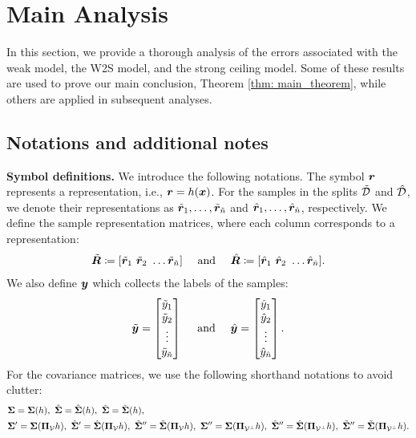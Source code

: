 
\section{Main Analysis}

In this section, we provide a thorough analysis of the errors associated with the weak model, the W2S model, and the strong ceiling model. Some of these results are used to prove our main conclusion, Theorem \ref{thm: main_theorem}, while others are applied in subsequent analyses.

\subsection{Notations and additional notes}

\textbf{Symbol definitions.} 
We introduce the following notations. The symbol ${\bm{r}}$ represents a representation, i.e., ${\bm{r}} = h({\bm{x}})$. For the samples in the splits $\tilde{{\mathcal{D}}}$ and $\hat{{\mathcal{D}}}$, we denote their representations as $\tilde{{\bm{r}}}_1, \dots, \tilde{{\bm{r}}}_{\tilde{n}}$ and $\hat{{\bm{r}}}_1, \dots, \hat{{\bm{r}}}_{\hat{n}}$, respectively. We define the sample representation matrices, where each column corresponds to a representation:
\begin{align}
    \nonumber
    \tilde{{\bm{R}}} \coloneqq [ \tilde{{\bm{r}}}_1 ~ \tilde{{\bm{r}}}_2 ~\dots \tilde{{\bm{r}}}_{\tilde{n}}  ] ~~~~\text{and}~~~~ \hat{{\bm{R}}} \coloneqq [ \hat{{\bm{r}}}_1 ~ \hat{{\bm{r}}}_2 ~\dots \hat{{\bm{r}}}_{\hat{n}}  ].
\end{align}
We also define ${\bm{y}}$ which collects the labels of the samples:
\begin{align}
    \nonumber
    \tilde{{\bm{y}}} =
\begin{bmatrix}
\tilde{y}_1 \\
\tilde{y}_2 \\
\vdots \\
\tilde{y}_{\tilde{n}}
\end{bmatrix}
 ~~~~\text{and}~~~~ 
 \hat{{\bm{y}}} =
\begin{bmatrix}
\hat{y}_1 \\
\hat{y}_2 \\
\vdots \\
\hat{y}_{\hat{n}}
\end{bmatrix}.
\end{align}
For the covariance matrices, we use the following shorthand notations to avoid clutter:
\begin{align}
    \nonumber
    &{\bm{\Sigma}} = {\bm{\Sigma}}(h),~ \hat{{\bm{\Sigma}}} = \hat{{\bm{\Sigma}}}(h),~ \tilde{{\bm{\Sigma}}} = \tilde{{\bm{\Sigma}}}(h),\\
    \nonumber
    &{\bm{\Sigma}}' = {\bm{\Sigma}}({\bm{\Pi}}_{{\mathcal{V}}}h),~ \hat{{\bm{\Sigma}}}' = \hat{{\bm{\Sigma}}}({\bm{\Pi}}_{{\mathcal{V}}}h),    ~\tilde{{\bm{\Sigma}}}'' = \tilde{{\bm{\Sigma}}}({\bm{\Pi}}_{{\mathcal{V}}}h),~{\bm{\Sigma}}'' = {\bm{\Sigma}}({\bm{\Pi}}_{{\mathcal{V}}^\perp}h),~ \hat{{\bm{\Sigma}}}'' = \hat{{\bm{\Sigma}}}({\bm{\Pi}}_{{\mathcal{V}}^\perp}h),    ~\tilde{{\bm{\Sigma}}}'' = \tilde{{\bm{\Sigma}}}({\bm{\Pi}}_{{\mathcal{V}}^\perp}h). 
\end{align}

